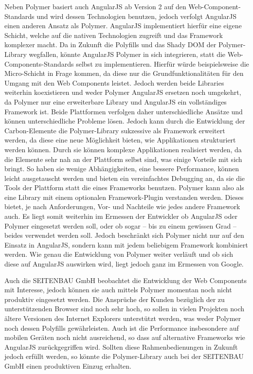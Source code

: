 Neben Polymer basiert auch AngularJS ab Version 2 auf den Web-Component-Stan\-dards und wird dessen Technologien benutzen, jedoch verfolgt AngularJS einen anderen Ansatz als Polymer. AngularJS implementiert hierfür eine eigene Schicht, welche auf die nativen Technologien zugreift und das Framework komplexer macht. Da in Zukunft die Polyfills und das Shady \ac{DOM} der Polymer-Library wegfallen, könnte AngularJS Polymer in sich integrieren, statt die Web-Components-Standards selbst zu implementieren. Hierfür würde beispielsweise die Micro-Schicht in Frage kommen, da diese nur die Grundfunktionalitäten für den Umgang mit den Web Components leistet. Jedoch werden beide Libraries weiterhin koexistieren und weder Polymer AngularJS ersetzen noch umgekehrt, da Polymer nur eine erweiterbare Library und AngularJS ein vollständiges Framework ist. Beide Plattformen verfolgen daher unterschiedliche Ansätze und können unterschiedliche Probleme lösen. Jedoch kann durch die Entwicklung der Carbon-Elemente die Polymer-Library sukzessive als Framework erweitert werden, da diese eine neue Möglichkeit bieten, wie Applikationen strukturiert werden können. Durch sie können komplexe Applikationen realisiert werden, da die Elemente sehr nah an der Plattform selbst sind, was einige Vorteile mit sich bringt. So haben sie wenige Abhängigkeiten, eine bessere Performance, können leicht ausgetauscht werden und bieten ein vereinfachtes Debugging an, da sie die Tools der Plattform statt die eines Frameworks benutzen. Polymer kann also als eine Library mit einem optionalen Framework-Plugin verstanden werden. Dieses bietet, je nach Anforderungen, Vor- und Nachteile wie jedes andere Framework auch. Es liegt somit weiterhin im Ermessen der Entwickler ob AngularJS oder Polymer eingesetzt werden soll, oder ob sogar -- bis zu einem gewissen Grad -- beides verwendet werden soll. Jedoch beschränkt sich Polymer nicht nur auf den Einsatz in AngularJS, sondern kann mit jedem beliebigem Framework kombiniert werden. Wie genau die Entwicklung von Polymer weiter verläuft und ob sich diese auf AngularJS auswirken wird, liegt jedoch ganz im Ermessen von Google.

Auch die SEITENBAU GmbH beobachtet die Entwicklung der Web Components mit Interesse, jedoch können sie auch mittels Polymer momentan noch nicht produktiv eingesetzt werden. Die Ansprüche der Kunden bezüglich der zu unterstützenden Browser sind noch sehr hoch, so sollen in vielen Projekten noch ältere Versionen des Internet Explorers unterstützt werden, was weder Polymer noch dessen Polyfills gewährleisten. Auch ist die Performance insbesondere auf mobilen Geräten noch nicht ausreichend, so dass auf alternative Frameworks wie AngularJS zurückgegriffen wird. Sollten diese Rahmenbedienungen in Zukunft jedoch erfüllt werden, so könnte die Polymer-Library auch bei der SEITENBAU GmbH einen produktiven Einzug erhalten.
